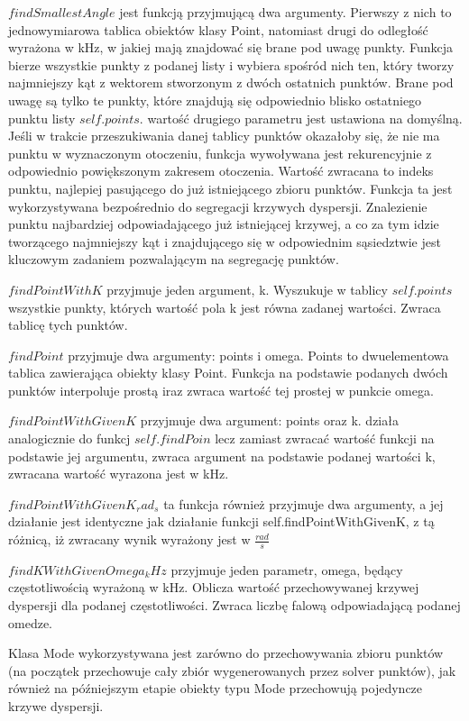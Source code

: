 $findSmallestAngle$ jest funkcją przyjmującą dwa argumenty. Pierwszy z nich to jednowymiarowa tablica obiektów klasy Point, natomiast drugi do odległość wyrażona w kHz, w jakiej mają znajdować się brane pod uwagę punkty. Funkcja bierze wszystkie punkty z podanej listy i wybiera spośród nich ten, który tworzy najmniejszy kąt z wektorem stworzonym z dwóch ostatnich punktów. Brane pod uwagę są tylko te punkty, które znajdują się odpowiednio blisko ostatniego punktu listy $self.points$. wartość drugiego parametru jest ustawiona na domyślną. Jeśli w trakcie przeszukiwania danej tablicy punktów okazałoby się, że nie ma punktu w wyznaczonym otoczeniu, funkcja wywoływana jest rekurencyjnie z odpowiednio powiększonym zakresem otoczenia. Wartość zwracana to indeks punktu, najlepiej pasującego do już istniejącego zbioru punktów. Funkcja ta jest wykorzystywana bezpośrednio do segregacji krzywych dyspersji. Znalezienie punktu najbardziej odpowiadającego już istniejącej krzywej, a co za tym idzie tworzącego najmniejszy kąt i znajdującego się w odpowiednim sąsiedztwie jest kluczowym zadaniem pozwalającym na segregację punktów.

$findPointWithK$ przyjmuje jeden argument, k. Wyszukuje w tablicy $self.points$ wszystkie punkty, których wartość pola k jest równa zadanej wartości. Zwraca tablicę tych punktów.

$findPoint$ przyjmuje dwa argumenty: points i omega. Points to dwuelementowa tablica zawierająca obiekty klasy Point. Funkcja na podstawie podanych dwóch punktów interpoluje prostą iraz zwraca wartość tej prostej w punkcie omega.

$findPointWithGivenK$ przyjmuje dwa argument: points oraz k. działa analogicznie do funkcj $self.findPoin$ lecz zamiast zwracać wartość funkcji na podstawie jej argumentu, zwraca argument na podstawie podanej wartości k, zwracana wartość wyrazona jest w kHz.

$findPointWithGivenK_rad_s$ ta funkcja również przyjmuje dwa argumenty, a jej działanie jest identyczne jak działanie funkcji self.findPointWithGivenK, z tą różnicą, iż zwracany wynik wyrażony jest w $\frac{rad}{s}$

$findKWithGivenOmega_kHz$ przyjmuje jeden parametr, omega, będący częstotliwością wyrażoną w kHz. Oblicza wartość przechowywanej krzywej dyspersji dla podanej częstotliwości. Zwraca liczbę falową odpowiadającą podanej omedze.

Klasa Mode wykorzystywana jest zarówno do przechowywania zbioru punktów (na początek przechowuje cały zbiór wygenerowanych przez solver punktów), jak również na późniejszym etapie obiekty typu Mode przechowują pojedyncze krzywe dyspersji.

